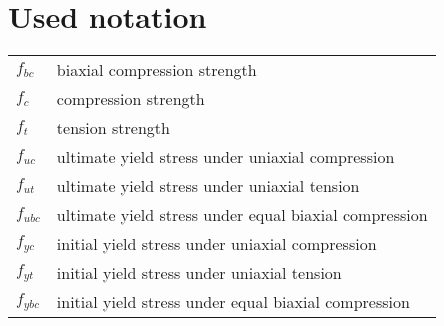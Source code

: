 \chapter{Used notation}

\begin{tabular}{ll}
$f_{bc}$ & biaxial compression strength
\\
$f_{c}$ & compression strength
\\
$f_{t}$ & tension strength
\\
$f_{uc}$ & ultimate yield stress under uniaxial compression
\\
$f_{ut}$ & ultimate yield stress under uniaxial tension
\\
$f_{ubc}$ & ultimate yield stress under equal biaxial compression
\\
$f_{yc}$ & initial yield stress under uniaxial compression
\\
$f_{yt}$ & initial yield stress under uniaxial tension
\\
$f_{ybc}$ & initial yield stress under equal biaxial compression
\end{tabular}
